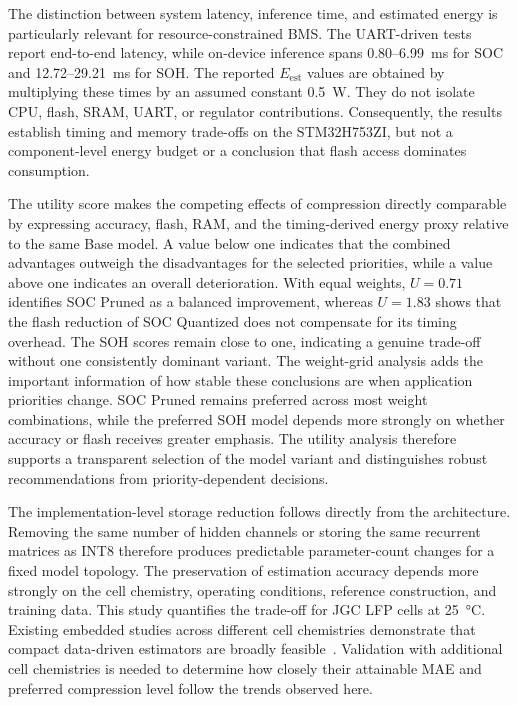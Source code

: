 \documentclass[final,3p,times]{elsarticle}
\begin{document}
The distinction between system latency, inference time, and estimated energy is particularly relevant for resource-constrained BMS. The UART-driven tests report end-to-end latency, while on-device inference spans 0.80--6.99~ms for SOC and 12.72--29.21~ms for SOH. The reported $E_{\mathrm{est}}$ values are obtained by multiplying these times by an assumed constant \SI{0.5}{\watt}. They do not isolate CPU, flash, SRAM, UART, or regulator contributions. Consequently, the results establish timing and memory trade-offs on the STM32H753ZI, but not a component-level energy budget or a conclusion that flash access dominates consumption.

The utility score makes the competing effects of compression directly comparable by expressing accuracy, flash, RAM, and the timing-derived energy proxy relative to the same Base model. A value below one indicates that the combined advantages outweigh the disadvantages for the selected priorities, while a value above one indicates an overall deterioration. With equal weights, $U=0.71$ identifies SOC Pruned as a balanced improvement, whereas $U=1.83$ shows that the flash reduction of SOC Quantized does not compensate for its timing overhead. The SOH scores remain close to one, indicating a genuine trade-off without one consistently dominant variant. The weight-grid analysis adds the important information of how stable these conclusions are when application priorities change. SOC Pruned remains preferred across most weight combinations, while the preferred SOH model depends more strongly on whether accuracy or flash receives greater emphasis. The utility analysis therefore supports a transparent selection of the model variant and distinguishes robust recommendations from priority-dependent decisions.

The implementation-level storage reduction follows directly from the architecture. Removing the same number of hidden channels or storing the same recurrent matrices as INT8 therefore produces predictable parameter-count changes for a fixed model topology. The preservation of estimation accuracy depends more strongly on the cell chemistry, operating conditions, reference construction, and training data. This study quantifies the trade-off for JGC LFP cells at \SI{25}{\degreeCelsius}. Existing embedded studies across different cell chemistries demonstrate that compact data-driven estimators are broadly feasible~\cite{giazitzisCaseStudyTiny2024,liOnlineCapacityEstimation2021,rzepkaNeuralNetworkArchitecture2023a}. Validation with additional cell chemistries is needed to determine how closely their attainable MAE and preferred compression level follow the trends observed here.
\end{document}
